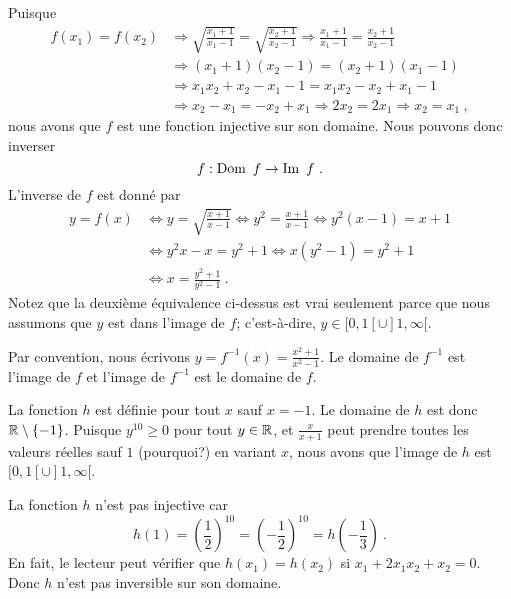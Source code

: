 {Puisque
\begin{align*}
f(x_1) = f(x_2) &\Rightarrow
\sqrt{ \frac{x_1+1}{x_1-1} } = \sqrt{ \frac{x_2+1}{x_2-1} }
\Rightarrow \frac{x_1+1}{x_1-1} = \frac{x_2+1}{x_2-1} \\
&\Rightarrow (x_1+1)(x_2-1) = (x_2+1)(x_1-1) \\
&\Rightarrow x_1 x_2 + x_2 - x_1 - 1 = x_1 x_2 - x_2 + x_1 -1 \\
&\Rightarrow x_2 - x_1 = - x_2 + x_1 \Rightarrow 2 x_2 = 2 x_1
\Rightarrow x_2 = x_1 \ ,
\end{align*}
nous avons que $f$ est une fonction injective sur son domaine.
Nous pouvons donc inverser
\[
f: \DO f \rightarrow \IM f \ .
\]
L'inverse de $f$ est donné par
\begin{align*}
y = f(x) &\Leftrightarrow y = \sqrt{ \frac{x+1}{x-1} }
\Leftrightarrow y^2 = \frac{x+1}{x-1}
\Leftrightarrow y^2 (x-1) = x + 1 \\
&\Leftrightarrow y^2 x - x = y^2 + 1
\Leftrightarrow x( y^2 - 1) = y^2 + 1 \\
&\Leftrightarrow x = \frac{y^2+1}{y^2-1} \ .
\end{align*}
Notez que la deuxième équivalence ci-dessus est vrai seulement
parce que nous assumons que $y$ est dans l'image de $f$;
c'est-à-dire, $y \in [0,1[\cup ]1, \infty[$.

Par convention, nous écrivons
$\displaystyle y = f^{-1}(x) = \frac{x^2+1}{x^2-1}$.  Le domaine de
$f^{-1}$ est l'image de $f$ et l'image de $f^{-1}$ est le domaine de
$f$.

  La fonction $h$ est définie pour tout $x$ sauf $x=-1$.
Le domaine de $h$ est donc $\mathbb{R} \setminus \{-1\}$.  Puisque
$y^{10} \geq 0$ pour tout $y \in \mathbb{R}$, et
$\displaystyle \frac{x}{x+1}$ peut prendre toutes les valeurs
réelles sauf $1$ (pourquoi?) en variant $x$, nous avons que l'image de $h$
est $[0,1[ \cup ]1,\infty[$. 

La fonction $h$ n'est pas injective car
\[
h(1) = \left( \frac{1}{2} \right)^{10} = \left( -\frac{1}{2} \right)^{10} = 
h\left(-\frac{1}{3}\right) \ .
\]
En fait, le lecteur peut vérifier que $h(x_1) = h(x_2)$ si
$x_1 + 2x_1 x_2 + x_2 = 0$.  Donc $h$ n'est pas inversible sur son
domaine.

}
